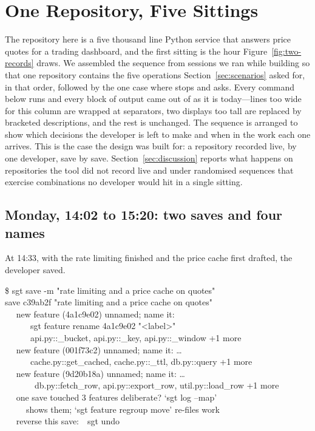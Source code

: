 \section{One Repository, Five Sittings}
\label{sec:walkthrough}

The repository here is a five thousand line Python service that answers price
quotes for a trading dashboard, and the first sitting is the hour
Figure~\ref{fig:two-records} draws. We assembled the sequence from sessions we ran
while building \sgt{} so that one repository contains the five operations
Section~\ref{sec:scenarios} asked for, in that order, followed by the one case
where \sgt{} stops and asks. Every command below runs and every block of output came out of \sgt{} as it is
today---lines too wide for this column are wrapped at \ttdot{} separators, two
displays too tall are replaced by bracketed descriptions, and the rest is
unchanged. The sequence is arranged to show
which decisions the developer is left to make and when in the work each one arrives.
This is the case the design was built for: a repository recorded live, by one
developer, save by save. Section~\ref{sec:discussion} reports what happens on
repositories the tool did not record live and under randomised sequences that
exercise combinations no developer would hit in a single sitting.

\subsection{Monday, 14:02 to 15:20: two saves and four names}

At 14:33, with the rate limiting finished and the price cache first drafted, the
developer saved.

\begin{out}
\$ sgt save -m "rate limiting and a price cache on quotes"\\
\ttok{} save c39ab2f "rate limiting and a price cache on quotes"\\
~~\ttbranch{}\ttnew{} new feature (4a1c9e02) \ttdash{} unnamed; name it:\\
~~\ttvert{}~~~~sgt feature rename 4a1c9e02 "<label>"\\
~~\ttvert{}~~~~api.py::\_bucket, api.py::\_key, api.py::\_window +1 more\\
~~\ttbranch{}\ttnew{} new feature (001f73c2) \ttdash{} unnamed; name it: \dots\\
~~\ttvert{}~~~~cache.py::get\_cached, cache.py::\_ttl, db.py::query +1 more\\
~~\ttlast{}\ttnew{} new feature (9d20b18a) \ttdash{} unnamed; name it: \dots\\
~~~~~~~db.py::fetch\_row, api.py::export\_row, util.py::load\_row +1 more\\
~~\ttwarn{} one save touched 3 features \ttdash{} deliberate? `sgt log --map'\\
~~~~~shows them; `sgt feature regroup move' re-files work\\
~~\ttundo{} reverse this save:~~sgt undo
\end{out}


